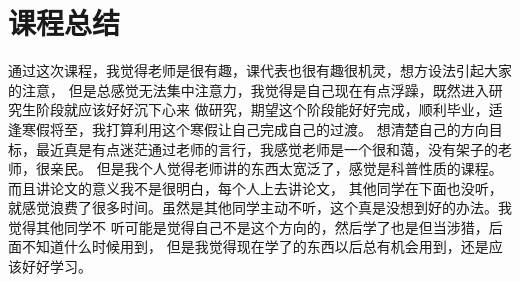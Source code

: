 \documentclass[UTF8]{ctexart}
\begin{document}
\section{课程总结}
\par{
	通过这次课程，我觉得老师是很有趣，课代表也很有趣很机灵，想方设法引起大家的注意，
	但是总感觉无法集中注意力，我觉得是自己现在有点浮躁，既然进入研究生阶段就应该好好沉下心来
	做研究，期望这个阶段能好好完成，顺利毕业，适逢寒假将至，我打算利用这个寒假让自己完成自己的过渡。
	想清楚自己的方向目标，最近真是有点迷茫通过老师的言行，我感觉老师是一个很和蔼，没有架子的老师，很亲民。
	但是我个人觉得老师讲的东西太宽泛了，感觉是科普性质的课程。而且讲论文的意义我不是很明白，每个人上去讲论文，
	其他同学在下面也没听，就感觉浪费了很多时间。虽然是其他同学主动不听，这个真是没想到好的办法。我觉得其他同学不
	听可能是觉得自己不是这个方向的，然后学了也是但当涉猎，后面不知道什么时候用到，
	但是我觉得现在学了的东西以后总有机会用到，还是应该好好学习。
}


\end{document}
